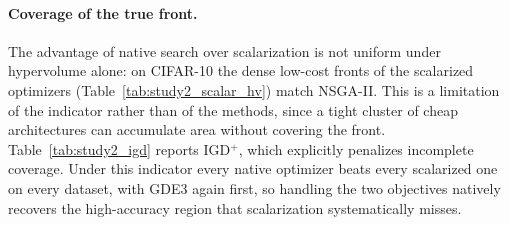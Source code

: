 \paragraph{Coverage of the true front.}
The advantage of native search over scalarization is not uniform under hypervolume alone: on CIFAR-10 the dense low-cost fronts of the scalarized optimizers (Table~\ref{tab:study2_scalar_hv}) match NSGA-II. This is a limitation of the indicator rather than of the methods, since a tight cluster of cheap architectures can accumulate area without covering the front. Table~\ref{tab:study2_igd} reports IGD$^{+}$, which explicitly penalizes incomplete coverage. Under this indicator every native optimizer beats every scalarized one on every dataset, with GDE3 again first, so handling the two objectives natively recovers the high-accuracy region that scalarization systematically misses.

\begin{table}[!ht]
    \centering
    \caption{Multi-objective \acrshort{nas}: mean IGD$^{+}$ ($\times 10^{-3}$) $\pm$ std over $N_{\mathrm{val}}=3$ seeds to the exact Pareto front (lower is better), for the three native optimizers and the scalarized baseline of Part~B. The best value per dataset is in bold. Unlike hypervolume, IGD$^{+}$ explicitly penalizes incomplete coverage of the true front.}
    \label{tab:study2_igd}
    \setlength{\tabcolsep}{4pt}
\end{table}

